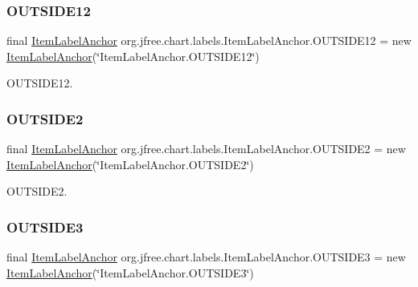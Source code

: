 \subsubsection{\texorpdfstring{O\+U\+T\+S\+I\+D\+E12}{OUTSIDE12}}
{\footnotesize\ttfamily final \mbox{\hyperlink{classorg_1_1jfree_1_1chart_1_1labels_1_1_item_label_anchor}{Item\+Label\+Anchor}} org.\+jfree.\+chart.\+labels.\+Item\+Label\+Anchor.\+O\+U\+T\+S\+I\+D\+E12 = new \mbox{\hyperlink{classorg_1_1jfree_1_1chart_1_1labels_1_1_item_label_anchor}{Item\+Label\+Anchor}}(\char`\"{}Item\+Label\+Anchor.\+O\+U\+T\+S\+I\+D\+E12\char`\"{})\hspace{0.3cm}{\ttfamily [static]}}

O\+U\+T\+S\+I\+D\+E12. \mbox{\label{classorg_1_1jfree_1_1chart_1_1labels_1_1_item_label_anchor_a36f8172b7af91ae604a95b878f0d796b}} 
\subsubsection{\texorpdfstring{O\+U\+T\+S\+I\+D\+E2}{OUTSIDE2}}
{\footnotesize\ttfamily final \mbox{\hyperlink{classorg_1_1jfree_1_1chart_1_1labels_1_1_item_label_anchor}{Item\+Label\+Anchor}} org.\+jfree.\+chart.\+labels.\+Item\+Label\+Anchor.\+O\+U\+T\+S\+I\+D\+E2 = new \mbox{\hyperlink{classorg_1_1jfree_1_1chart_1_1labels_1_1_item_label_anchor}{Item\+Label\+Anchor}}(\char`\"{}Item\+Label\+Anchor.\+O\+U\+T\+S\+I\+D\+E2\char`\"{})\hspace{0.3cm}{\ttfamily [static]}}

O\+U\+T\+S\+I\+D\+E2. \mbox{\label{classorg_1_1jfree_1_1chart_1_1labels_1_1_item_label_anchor_aca61f66465cb59fa88a3533dd287f614}} 
\subsubsection{\texorpdfstring{O\+U\+T\+S\+I\+D\+E3}{OUTSIDE3}}
{\footnotesize\ttfamily final \mbox{\hyperlink{classorg_1_1jfree_1_1chart_1_1labels_1_1_item_label_anchor}{Item\+Label\+Anchor}} org.\+jfree.\+chart.\+labels.\+Item\+Label\+Anchor.\+O\+U\+T\+S\+I\+D\+E3 = new \mbox{\hyperlink{classorg_1_1jfree_1_1chart_1_1labels_1_1_item_label_anchor}{Item\+Label\+Anchor}}(\char`\"{}Item\+Label\+Anchor.\+O\+U\+T\+S\+I\+D\+E3\char`\"{})\hspace{0.3cm}{\ttfamily [static]}}

